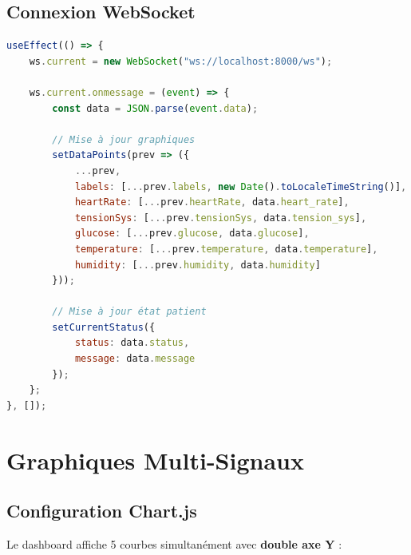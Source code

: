 \documentclass[12pt,french]{report}
\begin{document}
\subsection{Connexion WebSocket}

\begin{lstlisting}[language=JavaScript]
useEffect(() => {
    ws.current = new WebSocket("ws://localhost:8000/ws");
    
    ws.current.onmessage = (event) => {
        const data = JSON.parse(event.data);
        
        // Mise à jour graphiques
        setDataPoints(prev => ({
            ...prev,
            labels: [...prev.labels, new Date().toLocaleTimeString()],
            heartRate: [...prev.heartRate, data.heart_rate],
            tensionSys: [...prev.tensionSys, data.tension_sys],
            glucose: [...prev.glucose, data.glucose],
            temperature: [...prev.temperature, data.temperature],
            humidity: [...prev.humidity, data.humidity]
        }));
        
        // Mise à jour état patient
        setCurrentStatus({
            status: data.status,
            message: data.message
        });
    };
}, []);
\end{lstlisting}

\section{Graphiques Multi-Signaux}

\subsection{Configuration Chart.js}

Le dashboard affiche 5 courbes simultanément avec \textbf{double axe Y} :
\end{document}
